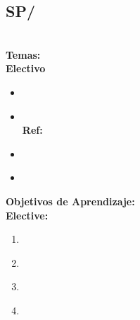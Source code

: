 \subsection{SP/\SPHistory}\label{sec:BOK:SPHistory}
\SPHistoryDescription\\
\noindent \textbf{Temas:}\\
\noindent \textbf{Electivo}
\begin{itemize}
	\item \SPHistoryTopicPrehistory\label{sec:BOK:SPHistoryTopicPrehistory}
	\item \SPHistoryTopicHistory\xspace \\ \textbf{Ref:} \label{sec:BOK:SPHistoryTopicHistory}
	\item \SPHistoryTopicPioneers\label{sec:BOK:SPHistoryTopicPioneers}
	\item \SPHistoryTopicHistoryOf\label{sec:BOK:SPHistoryTopicHistoryOf}
\end{itemize}


\noindent \textbf{Objetivos de Aprendizaje:}\\
\noindent \textbf{Elective:}
\begin{enumerate}
	\setcounter{enumi}{0}
	\item \SPHistoryLOIdentifySignificant\xspace[\SPHistoryLOIdentifySignificantLevel]\label{sec:BOK:SPHistoryLOIdentifySignificant}
	\item \SPHistoryLOIdentifyTheSeveral\xspace[\SPHistoryLOIdentifyTheSeveralLevel]\label{sec:BOK:SPHistoryLOIdentifyTheSeveral}
	\item \SPHistoryLODiscussTheForLanguage\xspace[\SPHistoryLODiscussTheForLanguageLevel]\label{sec:BOK:SPHistoryLODiscussTheForLanguage}
	\item \SPHistoryLOCompareDaily\xspace[\SPHistoryLOCompareDailyLevel]\label{sec:BOK:SPHistoryLOCompareDaily}
\end{enumerate}


